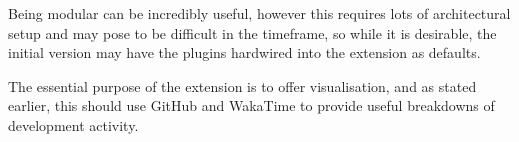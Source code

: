 \documentclass{mprop}
\begin{document}
Being modular can be incredibly useful, however this requires lots of architectural setup and may pose to be difficult in the timeframe, so while it is desirable, the initial version may have the plugins hardwired into the extension as defaults.

The essential purpose of the extension is to offer visualisation, and as stated earlier, this should use GitHub and WakaTime to provide useful breakdowns of development activity.


\printbibliography%
\end{document}
